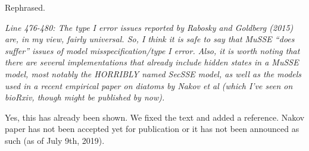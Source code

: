 \documentclass[11pt]{article}
\renewenvironment{quote}{\bigskip\noindent\itshape\ignorespaces}{\smallskip}
\begin{document}
Rephrased.


\begin{quote}
Line 476-480: The type I error issues reported by Rabosky and Goldberg (2015) are, in my view, fairly universal.
So, I think it is safe to say that MuSSE ``does suffer'' issues of model misspecification/type I error.
Also, it is worth noting that there are several implementations that already include hidden states in a MuSSE model, most notably the HORRIBLY named SecSSE model, as well as the models used in a recent empirical paper on diatoms by Nakov et al (which I've seen on bioRxiv, though might be published by now).
\end{quote}

Yes, this has already been shown.
We fixed the text and added a reference. 
Nakov paper has not been accepted yet for publication or it has not been announced as such (as of July 9th, 2019).



\end{document}
